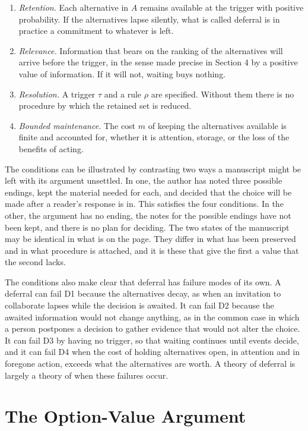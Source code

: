 \documentclass[11pt]{article}
\theoremstyle{remark}
\begin{document}
\begin{enumerate}
\item[(D1)] \emph{Retention.} Each alternative in $A$ remains available at the trigger with positive probability. If the alternatives lapse silently, what is called deferral is in practice a commitment to whatever is left.
\item[(D2)] \emph{Relevance.} Information that bears on the ranking of the alternatives will arrive before the trigger, in the sense made precise in Section 4 by a positive value of information. If it will not, waiting buys nothing.
\item[(D3)] \emph{Resolution.} A trigger $\tau$ and a rule $\rho$ are specified. Without them there is no procedure by which the retained set is reduced.
\item[(D4)] \emph{Bounded maintenance.} The cost $m$ of keeping the alternatives available is finite and accounted for, whether it is attention, storage, or the loss of the benefits of acting.
\end{enumerate}

The conditions can be illustrated by contrasting two ways a manuscript might be left with its argument unsettled. In one, the author has noted three possible endings, kept the material needed for each, and decided that the choice will be made after a reader's response is in. This satisfies the four conditions. In the other, the argument has no ending, the notes for the possible endings have not been kept, and there is no plan for deciding. The two states of the manuscript may be identical in what is on the page. They differ in what has been preserved and in what procedure is attached, and it is these that give the first a value that the second lacks.

The conditions also make clear that deferral has failure modes of its own. A deferral can fail D1 because the alternatives decay, as when an invitation to collaborate lapses while the decision is awaited. It can fail D2 because the awaited information would not change anything, as in the common case in which a person postpones a decision to gather evidence that would not alter the choice. It can fail D3 by having no trigger, so that waiting continues until events decide, and it can fail D4 when the cost of holding alternatives open, in attention and in foregone action, exceeds what the alternatives are worth. A theory of deferral is largely a theory of when these failures occur.

\section{The Option-Value Argument}
\end{document}
